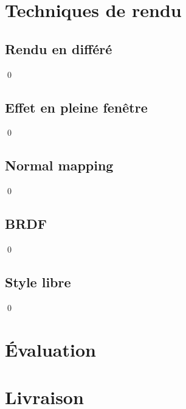\documentclass[12pt]{article}
\newcommand{\state}{\noindent}
\begin{document}
\section{Techniques de rendu}

\subsection{Rendu en différé}

\state

\qed

\subsection{Effet en pleine fenêtre}

\state

\qed

\subsection{Normal mapping}

\state

\qed

\subsection{BRDF}

\state

\qed

\subsection{Style libre}

\state

\qed

\pagebreak

\section*{Évaluation}

\pagebreak

\section*{Livraison}

\pagebreak
\end{document}
